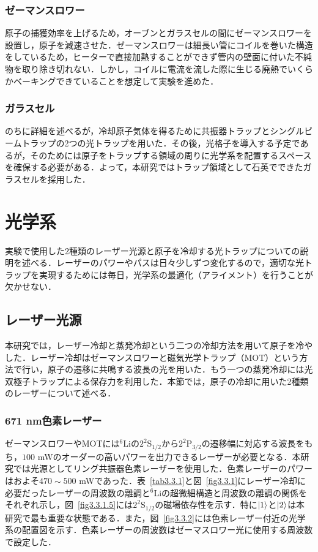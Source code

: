 \documentclass[11pt,a4j,notitlepage]{jreport}
\newcommand{\fig}[1]{図~\ref{#1}}	%
\newcommand{\tab}[1]{表~\ref{#1}}	%
\begin{document}
\subsubsection{ゼーマンスロワー}
原子の捕獲効率を上げるため，オーブンとガラスセルの間にゼーマンスロワーを設置し，原子を減速させた．ゼーマンスロワーは細長い管にコイルを巻いた構造をしているため，ヒーターで直接加熱することができず管内の壁面に付いた不純物を取り除き切れない．しかし，コイルに電流を流した際に生じる廃熱でいくらかベーキングできていることを想定して実験を進めた．

\subsubsection{ガラスセル}
のちに詳細を述べるが，冷却原子気体を得るために共振器トラップとシングルビームトラップの2つの光トラップを用いた．その後，光格子を導入する予定であるが，そのためには原子をトラップする領域の周りに光学系を配置するスペースを確保する必要がある．よって，本研究ではトラップ領域として石英でできたガラスセルを採用した．

\section{光学系}
実験で使用した2種類のレーザー光源と原子を冷却する光トラップについての説明を述べる．レーザーのパワーやパスは日々少しずつ変化するので，適切な光トラップを実現するためには毎日，光学系の最適化（アライメント）を行うことが欠かせない．

\subsection{レーザー光源}
本研究では，レーザー冷却と蒸発冷却という二つの冷却方法を用いて原子を冷やした．レーザー冷却はゼーマンスロワーと磁気光学トラップ（MOT）という方法で行い，原子の遷移に共鳴する波長の光を用いた．もう一つの蒸発冷却には光双極子トラップによる保存力を利用した．本節では，原子の冷却に用いた2種類のレーザーについて述べる．

\subsubsection{671 nm色素レーザー}
ゼーマンスロワーやMOTには$^6$Liの$2^2$S$_{1/2}$から$2^2$P$_{3/2}$の遷移幅に対応する波長をもち，$100$ mWのオーダーの高いパワーを出力できるレーザーが必要となる．本研究では光源としてリング共振器色素レーザーを使用した．色素レーザーのパワーはおよそ$470\sim500$ mWであった．\tab{tab3.3.1}と\fig{fig3.3.1}にレーザー冷却に必要だったレーザーの周波数の離調と$^6$Liの超微細構造と周波数の離調の関係をそれぞれ示し，\fig{fig3.3.1.5}には$2^2$S$_{1/2}$の磁場依存性を示す．特に$\ket{1}$と$\ket{2}$は本研究で最も重要な状態である．また，\fig{fig3.3.2}には色素レーザー付近の光学系の配置図を示す．色素レーザーの周波数はゼーマスロワー光に使用する周波数で設定した．
\end{document}
